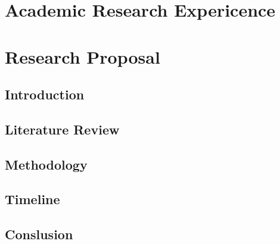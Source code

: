 \documentclass{phdproposal}
\title{}
\author{王~鹏~程}    %
\begin{document}
    \frontmatter


    \clearpage
	
    \startCustomStyleSection[nopagenum]


	\clearpage

    \mainmatter


% 

\clearpage
\chapter{Academic Research Expericence}


\chapter{Research Proposal}
\section{Introduction}


\clearpage
\section{Literature Review}


\clearpage
\section{Methodology}


\section{Timeline}


\section{Conslusion}

\end{document}
